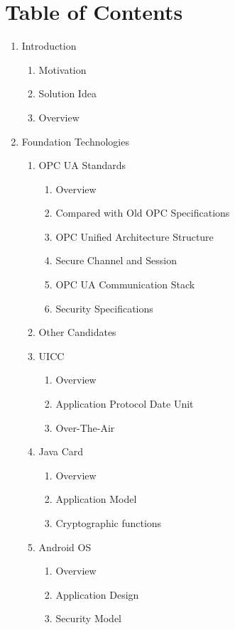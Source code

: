 \documentclass[]{llncs}
\begin{document}
\section{Table of Contents}

\begin{enumerate}
	\item Introduction
  	\begin{enumerate}[label*=\arabic*.]
    	\item Motivation
	\item Solution Idea
    	\item Overview
	\end{enumerate}
	\item Foundation Technologies
  	\begin{enumerate}[label*=\arabic*.]
    	\item OPC UA Standards
		\begin{enumerate}[label*=\arabic*.]
		\item Overview
		\item Compared with Old OPC Specifications
		\item OPC Unified Architecture Structure
		\item Secure Channel and Session
		\item  OPC UA Communication Stack
		\item Security Specifications
		\end{enumerate}
	\item Other Candidates
    	\item UICC
		\begin{enumerate}[label*=\arabic*.]
		\item Overview
		\item Application Protocol Date Unit
		\item Over-The-Air
		\end{enumerate}
    	\item Java Card
		\begin{enumerate}[label*=\arabic*.]
		\item Overview
		\item Application Model
		\item Cryptographic functions
		\end{enumerate}
    	\item Android OS
		\begin{enumerate}[label*=\arabic*.]
		\item Overview 
		\item Application Design
		\item Security Model

\end{enumerate}
\end{enumerate}
\end{enumerate}
\end{document}
